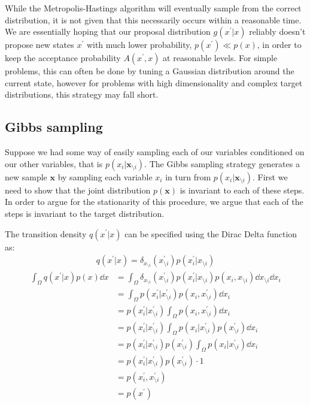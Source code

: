 While the Metropolis-Hastings algorithm will eventually sample from the correct distribution, it is not given that this necessarily occurs within a reasonable time. 
We are essentially hoping that our proposal distribution $g(x^\prime | x)$ reliably doesn't propose new states $x^\prime$ with much lower probability, $p(x^\prime) \ll p(x) $, in order to keep the acceptance probability $A(x^\prime, x)$ at reasonable levels. 
For simple problems, this can often be done by tuning a Gaussian distribution around the current state, however for problems with high dimensionality and complex target distributions, this strategy may fall short.

\subsection{Gibbs sampling}

Suppose we had some way of easily sampling each of our variables conditioned on our other variables, that is $p(x_i|\bm{x}_{\setminus i})$. 
The Gibbs sampling strategy generates a new sample $\bm{x}$ by sampling each variable $x_i$ in turn from $p(x_i|\bm{x}_{\setminus i})$.  
First we need to show that the joint distribution $p(\bm{x})$ is invariant to each of these steps. 
In order to argue for the stationarity of this procedure, we argue that each of the steps is invariant to the target distribution.

The transition density $q(x^\prime| x)$ can be specified using the Dirac Delta function as:
\begin{align*}
    q(x^\prime| x) = \delta_{x_{\setminus i}}(x^\prime_{\setminus i}) p(x_i^\prime|x_{\setminus i})
\end{align*}
\begin{align*}
    \int_{\Omega} q(x^\prime| x) p(x) \dd{x}  
    &= \int_{\Omega}  \delta_{x_{\setminus i}}(x^\prime_{\setminus i}) p(x_i^\prime|x_{\setminus i}) p(x_i,x_{\setminus i}) \dd{x_{\setminus i}} \dd{x_i} \\
    &= \int_{\Omega} p(x^\prime_i|x^\prime_{\setminus i}) p(x_i,x^\prime_{\setminus i}) \dd{x_i} \\ 
    &= p(x^\prime_i|x^\prime_{\setminus i}) \int_{\Omega}  p(x_i,x^\prime_{\setminus i}) \dd{x_i} \\ 
    &= p(x^\prime_i|x^\prime_{\setminus i}) \int_{\Omega}  p(x_i | x^\prime_{\setminus i}) p(x^\prime_{\setminus i}) \dd{x_i} \\ 
    &= p(x^\prime_i|x^\prime_{\setminus i}) p(x^\prime_{\setminus i}) \int_{\Omega}  p(x_i | x^\prime_{\setminus i})  \dd{x_i} \\ 
    &= p(x^\prime_i|x^\prime_{\setminus i}) p(x^\prime_{\setminus i}) \cdot 1 \\
    &=  p(x^\prime_i,x^\prime_{\setminus i})  \\
    &= p(x^\prime)
\end{align*}

